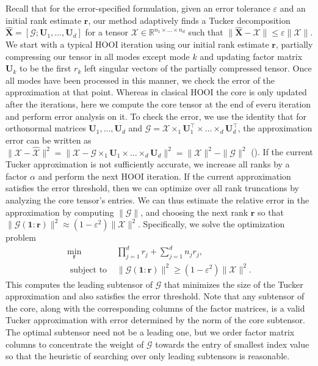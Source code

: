     Recall that for the error-specified formulation, given an error tolerance
    $\varepsilon$ and an initial rank estimate $\mathbf{r}$, our method adaptively
    finds a Tucker decomposition $\mathbf{\hat{X}} = [\mathcal{G}; \mathbf{U}_{1}, \dots,
    \mathbf{U}_{d}]$ for a tensor $\mathcal{X} \in \mathbb{R}^{n_1 \times \dots \times
    n_d}$ such that $\| \mathbf{\hat{X}} - \mathcal{X} \| \leq \varepsilon \| \mathcal{X} \|$.
    We start with a typical HOOI iteration using our initial rank estimate
    $\mathbf{r}$, partially compressing our tensor in all modes except mode $k$ and
    updating factor matrix $\mathbf{U}_{k}$ to be the first $r_k$ left singular
    vectors of the partially compressed tensor. Once all modes have been
    processed in this manner, we check the error of the approximation at that
    point. 
    Whereas in clasical HOOI the core is only updated after the iterations, here
    we compute the core tensor at the end of everu iteration and perform error
    analysis on it. To check the error, we use the identity that for orthonormal
    matrices $\mathbf{U}_{1},\dots,\mathbf{U}_{d}$ and $\mathcal{G} = \mathcal{X} \times_1
    \mathbf{U}_{1}^\intercal \times \dots \times_d \mathbf{U}_{d}^\intercal$, the approximation error can be
    written as $\| \mathcal{X} - \mathcal{\hat{X}} \|^2 = \| \mathcal{X} - \mathcal{G} \times_1
    \mathbf{U}_{1} \times \dots \times_d \mathbf{U}_{d} \|^2 = \| \mathcal{X} \|^2 - \| \mathcal{G}
    \|^2$ (\cite[Proposition 6.3]{BK25}). If the current Tucker approximation is
    not sufficiently accurate, we increase all ranks by a factor $\alpha$ and
    perform the next HOOI iteration. If the current approximation satisfies the
    error threshold, then we can optimize over all rank truncations by analyzing
    the core tensor's entries.
    We can thus estimate the relative error in the approximation by computing
    $\| \mathcal{G} \|$, and choosing the next rank $\mathbf{r}$ so that $\|
    \mathcal{G}(\mathbf{1}:\mathbf{r})\|^2 \approx (1 - \varepsilon^2) \| \mathcal{X} \|^2.$ 
    Specifically, we solve the optimization problem
    \begin{equation}\label{eq:rankcond}
    \begin{aligned}
    \min_{\mathbf{r}} \quad & \prod_{j=1}^d r_j + \sum_{j=1}^{d} n_j r_j,\\ 
    \text{ subject to } &\|\mathcal{G}(\mathbf{1}:\mathbf{r}) \|^2 \geq (1 - \varepsilon^2) \| \mathcal{X} \|^2.
    \end{aligned}
    \end{equation}
    This computes the leading subtensor of $\mathcal{G}$ that minimizes the size of
    the Tucker approximation and also satisfies the error threshold. Note that
    any subtensor of the core, along with the corresponding columns of the
    factor matrices, is a valid Tucker approximation with error determined by
    the norm of the core subtensor. The optimal subtensor need not be a leading
    one, but we order factor matrix columns to concentrate the weight of
    $\mathcal{G}$ towards the entry of smallest index value so that the heuristic of
    searching over only leading subtensors is reasonable.

